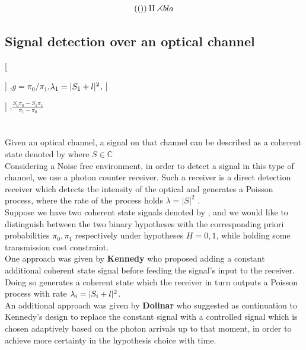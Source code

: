 \documentclass[12pt]{article}
\newcommand{\lambdaWave}{\overline{\lambda}}
\newcommand{\lambdaSwitch}[1]{%
		\IfEqCase{#1}{%
			{0}{\lambda_0=|S_0+l|^2}%
			{1}{\lambda_1=|S_1+l|^2}%
			{i}{\lambda_i=|S_i+l|^2}%
			{~}{\widetilde{\lambda}=\pi_{0}\sqrt{\lambda_{0}}+\pi_{1}\sqrt{\lambda_{1}}}%
			{-}{\lambdaWave=\pi_{0}\lambda_{0}+\pi_{1}\lambda_{1}}%
		}[\PackageError{tree}{Undefined option to tree: #1}{}]%
	}%
\newcommand{\piSwitch}[1]{%
		\IfEqCase{#1}{%
			{0}{$\pi_{0} = \frac{g}{g+1}$}%
			{1}{$\pi_{1} = \frac{1}{g+1}$}%
		}[\PackageError{tree}{Undefined option to tree: #1}{}]%
	}%
\newcommand{\g}{$g = \pi_{0}/\pi_{1}$}
\newcommand{\lStar}{\frac{S_{0}\pi_{0} - S_{1}\pi_{1}}{\pi_{1}-\pi_{0}}}
\newcommand{\piG}[1]{%
		\IfEqCase{#1}{%
			{0}{$\pi_{0} = \frac{g}{g+1}$}%
			{1}{$\pi_{1} = \frac{1}{g+1}$}%
		}[\PackageError{tree}{Undefined option to tree: #1}{}]%
	}%
\begin{document}
	\begin{equation}
		\left( \left( \right) \right) \amalg\rightthreetimes\\
		bla
	\end{equation}	

	\begin{center}
		\section*{Signal detection over an optical channel}
	
	\end{center}
	\vspace{0.5cm}

	\piSwitch{0},\quad\g,\quad $\lambdaSwitch{1}$,\quad\piG{0},\quad$\lStar$\\\\\\
	 
	Given an optical channel, a signal on that channel can be described as a coherent state denoted by  where  $S\in\mathbb{C}$\\

	Considering a Noise free environment, in order to detect a signal in this type of channel, 
	we use a photon counter receiver. Such a receiver is a direct detection receiver which detects 
	the intensity of the optical and generates a Poisson process, where the rate of the process holds $\lambda = |S|^2$ .\\
	
	Suppose we have two coherent state signals denoted by ,  and we would like to distinguish between the two 
	binary hypotheses with the corresponding priori probabilities $\pi_0, \pi_1$ respectively under hypotheses $H=0,1$, 
	while holding some transmission cost constraint.\\
	
	One approach was given by \textbf{Kennedy} who proposed adding a constant additional coherent state signal 
	before feeding the signal’s input to the receiver. Doing so generates a coherent state  which 
	the receiver in turn outputs a Poisson process with rate $\lambdaSwitch{i}$.\\

	An additional approach was given by \textbf{Dolinar} who suggested as continuation to Kennedy’s design to replace the constant 
	signal with a controlled signal  which is chosen adaptively based on the photon arrivals up to that moment, 
	in order to achieve more certainty in the hypothesis choice with time.\\
\end{document}
